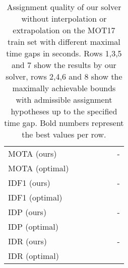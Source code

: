 \documentclass{article}
\begin{document}
\begin{table}[hbt]

    \centering
\tabcolsep=0.09cm
\begin{tabular}{lcccccc}
\toprule  &   &  &  &  &  &  \\ \hline
MOTA (ours) &  &   &   &   &   & - \\
MOTA (optimal) & &  &  &  &   & \\ \hline 
IDF1 (ours)  &  &   &   &   &   & - \\
IDF1 (optimal) & &  &  & &   & \\ \hline
IDP (ours)  &  &   &   &   &   & - \\
IDP (optimal) & &  &  & &   &   \\ \hline
IDR (ours)  &  &   &   &   &   & - \\
IDR (optimal) & &  &  & &   & \\ \bottomrule
\end{tabular}   
\caption{Assignment quality of our solver without interpolation or extrapolation on the MOT17 train set with different maximal time gaps in seconds. Rows 1,3,5 and 7 show the results by our solver, rows 2,4,6 and 8 show the maximally achievable bounds with admissible assignment hypotheses up to the specified time gap. 
Bold numbers represent the best values per row.}
    \label{tab:tracking_performance_over_time}

\end{table}{}
\end{document}
